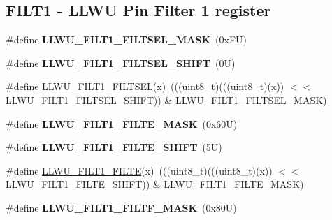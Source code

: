 \subsection*{F\+I\+L\+T1 -\/ L\+L\+WU Pin Filter 1 register}
\begin{DoxyCompactItemize}
\item 
\mbox{\label{group___l_l_w_u___register___masks_gaa44e21d07f509d1f5d6cec9da32ab8ab}} 
\#define {\bfseries L\+L\+W\+U\+\_\+\+F\+I\+L\+T1\+\_\+\+F\+I\+L\+T\+S\+E\+L\+\_\+\+M\+A\+SK}~(0x\+F\+U)
\item 
\mbox{\label{group___l_l_w_u___register___masks_gaab2a7991b2b135f0557b1b41cc3528f7}} 
\#define {\bfseries L\+L\+W\+U\+\_\+\+F\+I\+L\+T1\+\_\+\+F\+I\+L\+T\+S\+E\+L\+\_\+\+S\+H\+I\+FT}~(0\+U)
\item 
\#define \mbox{\hyperlink{group___l_l_w_u___register___masks_ga9d7876a517542c2fa363b9f15d375d69}{L\+L\+W\+U\+\_\+\+F\+I\+L\+T1\+\_\+\+F\+I\+L\+T\+S\+EL}}(x)~(((uint8\+\_\+t)(((uint8\+\_\+t)(x)) $<$$<$ L\+L\+W\+U\+\_\+\+F\+I\+L\+T1\+\_\+\+F\+I\+L\+T\+S\+E\+L\+\_\+\+S\+H\+I\+FT)) \& L\+L\+W\+U\+\_\+\+F\+I\+L\+T1\+\_\+\+F\+I\+L\+T\+S\+E\+L\+\_\+\+M\+A\+SK)
\item 
\mbox{\label{group___l_l_w_u___register___masks_gae449f984f9cfeec99ab8380e356b57c7}} 
\#define {\bfseries L\+L\+W\+U\+\_\+\+F\+I\+L\+T1\+\_\+\+F\+I\+L\+T\+E\+\_\+\+M\+A\+SK}~(0x60\+U)
\item 
\mbox{\label{group___l_l_w_u___register___masks_ga0d4b7527c910e60bdf1f52e51b1c0932}} 
\#define {\bfseries L\+L\+W\+U\+\_\+\+F\+I\+L\+T1\+\_\+\+F\+I\+L\+T\+E\+\_\+\+S\+H\+I\+FT}~(5\+U)
\item 
\#define \mbox{\hyperlink{group___l_l_w_u___register___masks_ga2eb83c2856ca0d1d7ff09384809aed2f}{L\+L\+W\+U\+\_\+\+F\+I\+L\+T1\+\_\+\+F\+I\+L\+TE}}(x)~(((uint8\+\_\+t)(((uint8\+\_\+t)(x)) $<$$<$ L\+L\+W\+U\+\_\+\+F\+I\+L\+T1\+\_\+\+F\+I\+L\+T\+E\+\_\+\+S\+H\+I\+FT)) \& L\+L\+W\+U\+\_\+\+F\+I\+L\+T1\+\_\+\+F\+I\+L\+T\+E\+\_\+\+M\+A\+SK)
\item 
\mbox{\label{group___l_l_w_u___register___masks_gabdb5ca902522996074a75ed08a7a8b03}} 
\#define {\bfseries L\+L\+W\+U\+\_\+\+F\+I\+L\+T1\+\_\+\+F\+I\+L\+T\+F\+\_\+\+M\+A\+SK}~(0x80\+U)

\end{DoxyCompactItemize}
